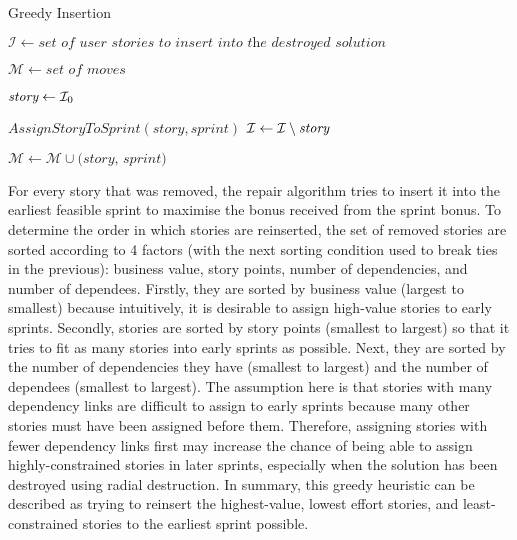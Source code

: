\begin{algorithm}[H]
\caption{Greedy Insertion}\label{greedy_insert}
\begin{algorithmic}[1]
    \State $\mathcal{I} \gets \textit{set of user stories to insert into the destroyed solution}$
    
        \State $\mathcal{M} \gets \textit{set of moves}$
        
            \State $\emph{story} \gets \mathcal{I}_0$
            
                    \State $AssignStoryToSprint(story, sprint)$
                    \State $\mathcal{I} \gets \mathcal{I} \setminus \emph{story}$
                \EndIf
            
                \State $\mathcal{M} \gets \mathcal{M} \cup \textit{(story, sprint)}$
            \EndFor
        \EndWhile
        
        \State {}
    \EndProcedure
\end{algorithmic}
\end{algorithm}

For every story that was removed, the repair algorithm tries to insert it into the earliest feasible sprint to maximise the bonus received from the sprint bonus. To determine the order in which stories are reinserted, the set of removed stories are sorted according to 4 factors (with the next sorting condition used to break ties in the previous): business value, story points, number of dependencies, and number of dependees. Firstly, they are sorted by business value (largest to smallest) because intuitively, it is desirable to assign high-value stories to early sprints. Secondly, stories are sorted by story points (smallest to largest) so that it tries to fit as many stories into early sprints as possible. Next, they are sorted by the number of dependencies they have (smallest to largest) and the number of dependees (smallest to largest). The assumption here is that stories with many dependency links are difficult to assign to early sprints because many other stories must have been assigned before them. Therefore, assigning stories with fewer dependency links first may increase the chance of being able to assign highly-constrained stories in later sprints, especially when the solution has been destroyed using radial destruction. In summary, this greedy heuristic can be described as trying to reinsert the highest-value, lowest effort stories, and least-constrained stories to the earliest sprint possible.

